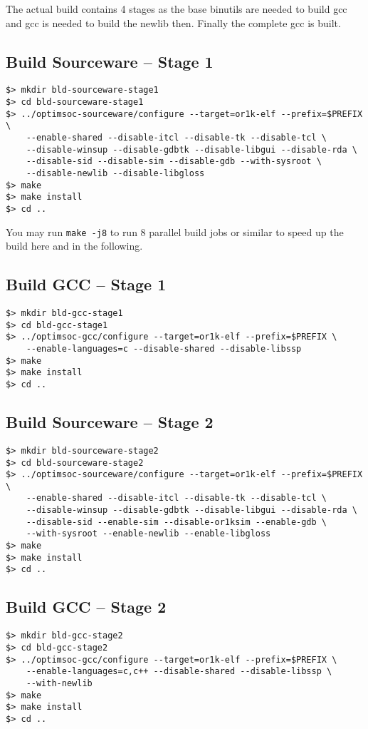 The actual build contains 4 stages as the base binutils are needed to
build gcc and gcc is needed to build the newlib then. Finally the
complete gcc is built.

\subsection{Build Sourceware -- Stage 1}

\begin{verbatim}
$> mkdir bld-sourceware-stage1
$> cd bld-sourceware-stage1
$> ../optimsoc-sourceware/configure --target=or1k-elf --prefix=$PREFIX \
    --enable-shared --disable-itcl --disable-tk --disable-tcl \
    --disable-winsup --disable-gdbtk --disable-libgui --disable-rda \
    --disable-sid --disable-sim --disable-gdb --with-sysroot \
    --disable-newlib --disable-libgloss
$> make
$> make install
$> cd ..
\end{verbatim}

You may run \verb|make -j8| to run 8 parallel build jobs or similar to
speed up the build here and in the following.

\subsection{Build GCC -- Stage 1}

\begin{verbatim}
$> mkdir bld-gcc-stage1
$> cd bld-gcc-stage1
$> ../optimsoc-gcc/configure --target=or1k-elf --prefix=$PREFIX \
    --enable-languages=c --disable-shared --disable-libssp
$> make
$> make install
$> cd ..
\end{verbatim}

\subsection{Build Sourceware -- Stage 2}

\begin{verbatim}
$> mkdir bld-sourceware-stage2
$> cd bld-sourceware-stage2
$> ../optimsoc-sourceware/configure --target=or1k-elf --prefix=$PREFIX \
    --enable-shared --disable-itcl --disable-tk --disable-tcl \
    --disable-winsup --disable-gdbtk --disable-libgui --disable-rda \
    --disable-sid --enable-sim --disable-or1ksim --enable-gdb \
    --with-sysroot --enable-newlib --enable-libgloss
$> make
$> make install
$> cd ..
\end{verbatim}

\subsection{Build GCC -- Stage 2}

\begin{verbatim}
$> mkdir bld-gcc-stage2
$> cd bld-gcc-stage2
$> ../optimsoc-gcc/configure --target=or1k-elf --prefix=$PREFIX \
    --enable-languages=c,c++ --disable-shared --disable-libssp \
    --with-newlib
$> make
$> make install
$> cd ..
\end{verbatim}

